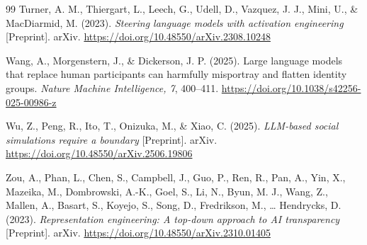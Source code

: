 \documentclass[onecolumn]{main}
\begin{document}
\begin{thebibliography}{99}
Turner, A. M., Thiergart, L., Leech, G., Udell, D., Vazquez, J. J., Mini, U., \& MacDiarmid, M. (2023). \textit{Steering language models with activation engineering} [Preprint]. arXiv. \url{https://doi.org/10.48550/arXiv.2308.10248}

Wang, A., Morgenstern, J., \& Dickerson, J. P. (2025). Large language models that replace human participants can harmfully misportray and flatten identity groups. \textit{Nature Machine Intelligence, 7}, 400--411. \url{https://doi.org/10.1038/s42256-025-00986-z}

Wu, Z., Peng, R., Ito, T., Onizuka, M., \& Xiao, C. (2025). \textit{LLM-based social simulations require a boundary} [Preprint]. arXiv. \url{https://doi.org/10.48550/arXiv.2506.19806}

Zou, A., Phan, L., Chen, S., Campbell, J., Guo, P., Ren, R., Pan, A., Yin, X., Mazeika, M., Dombrowski, A.-K., Goel, S., Li, N., Byun, M. J., Wang, Z., Mallen, A., Basart, S., Koyejo, S., Song, D., Fredrikson, M., \dots{} Hendrycks, D. (2023). \textit{Representation engineering: A top-down approach to AI transparency} [Preprint]. arXiv. \url{https://doi.org/10.48550/arXiv.2310.01405}

\end{thebibliography}
\end{document}
